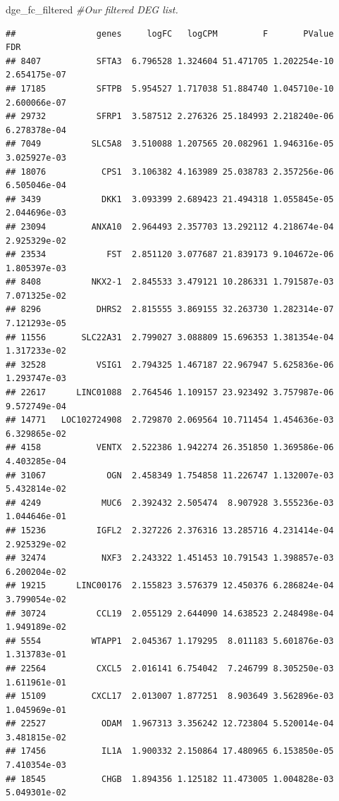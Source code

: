 \documentclass[
]{article}
\newenvironment{Shaded}{\begin{snugshade}}{\end{snugshade}}
\newcommand{\CommentTok}[1]{\textcolor[rgb]{0.56,0.35,0.01}{\textit{#1}}}
\newcommand{\NormalTok}[1]{#1}
\begin{document}
\begin{Shaded}
\begin{Highlighting}[]
\NormalTok{dge\_fc\_filtered }\CommentTok{\#Our filtered DEG list.}
\end{Highlighting}
\end{Shaded}

\begin{verbatim}
##                genes     logFC   logCPM         F       PValue          FDR
## 8407           SFTA3  6.796528 1.324604 51.471705 1.202254e-10 2.654175e-07
## 17185          SFTPB  5.954527 1.717038 51.884740 1.045710e-10 2.600066e-07
## 29732          SFRP1  3.587512 2.276326 25.184993 2.218240e-06 6.278378e-04
## 7049          SLC5A8  3.510088 1.207565 20.082961 1.946316e-05 3.025927e-03
## 18076           CPS1  3.106382 4.163989 25.038783 2.357256e-06 6.505046e-04
## 3439            DKK1  3.093399 2.689423 21.494318 1.055845e-05 2.044696e-03
## 23094         ANXA10  2.964493 2.357703 13.292112 4.218674e-04 2.925329e-02
## 23534            FST  2.851120 3.077687 21.839173 9.104672e-06 1.805397e-03
## 8408          NKX2-1  2.845533 3.479121 10.286331 1.791587e-03 7.071325e-02
## 8296           DHRS2  2.815555 3.869155 32.263730 1.282314e-07 7.121293e-05
## 11556       SLC22A31  2.799027 3.088809 15.696353 1.381354e-04 1.317233e-02
## 32528          VSIG1  2.794325 1.467187 22.967947 5.625836e-06 1.293747e-03
## 22617      LINC01088  2.764546 1.109157 23.923492 3.757987e-06 9.572749e-04
## 14771   LOC102724908  2.729870 2.069564 10.711454 1.454636e-03 6.329865e-02
## 4158           VENTX  2.522386 1.942274 26.351850 1.369586e-06 4.403285e-04
## 31067            OGN  2.458349 1.754858 11.226747 1.132007e-03 5.432814e-02
## 4249            MUC6  2.392432 2.505474  8.907928 3.555236e-03 1.044646e-01
## 15236          IGFL2  2.327226 2.376316 13.285716 4.231414e-04 2.925329e-02
## 32474           NXF3  2.243322 1.451453 10.791543 1.398857e-03 6.200204e-02
## 19215      LINC00176  2.155823 3.576379 12.450376 6.286824e-04 3.799054e-02
## 30724          CCL19  2.055129 2.644090 14.638523 2.248498e-04 1.949189e-02
## 5554          WTAPP1  2.045367 1.179295  8.011183 5.601876e-03 1.313783e-01
## 22564          CXCL5  2.016141 6.754042  7.246799 8.305250e-03 1.611961e-01
## 15109         CXCL17  2.013007 1.877251  8.903649 3.562896e-03 1.045969e-01
## 22527           ODAM  1.967313 3.356242 12.723804 5.520014e-04 3.481815e-02
## 17456           IL1A  1.900332 2.150864 17.480965 6.153850e-05 7.410354e-03
## 18545           CHGB  1.894356 1.125182 11.473005 1.004828e-03 5.049301e-02

\end{verbatim}
\end{document}
